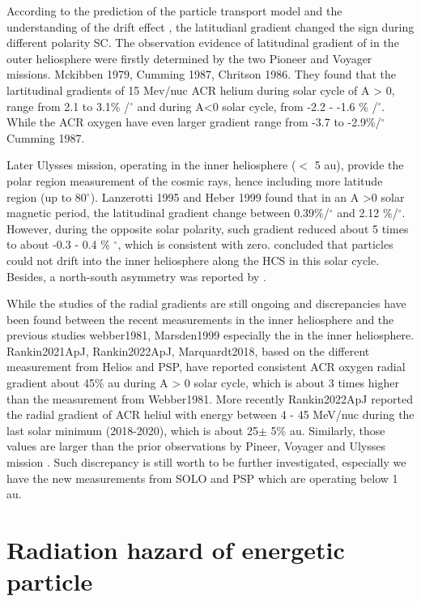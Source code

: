 According to the prediction of the particle transport model and the understanding of the drift effect , the latitudianl gradient changed the sign during different polarity \ac{SC}. The observation evidence of latitudinal gradient of in the outer heliosphere were firstly determined by the two Pioneer and Voyager missions. {Mckibben 1979, Cumming 1987, Chritson 1986}. They found that the lartitudinal gradients of 15 Mev/nuc \ac{ACR} helium during solar cycle of A > 0, range from 2.1 to 3.1\% /$^\circ$ and during A<0 solar cycle, from -2.2 - -1.6 \% /$^\circ$. While the ACR oxygen have even larger gradient range from -3.7 to -2.9\%/$^\circ$ {Cumming 1987}.

Later Ulysses mission, operating in the inner heliosphere ($<$ 5 au),  provide the polar region measurement of the cosmic rays, hence including more latitude region (up to 80$^\circ$). Lanzerotti 1995 and Heber 1999 found that in an A >0 solar magnetic period, the latitudinal gradient change between  0.39\%/$^\circ$ and 2.12 \%/$^\circ$. However, during the opposite solar polarity, such gradient reduced about 5 times to about -0.3 - 0.4 \% \/$^\circ$, which is consistent with zero. \citep{Cummings2009GeoRL} concluded that particles could not drift into the inner heliosphere along the \ac{HCS} in this solar cycle. Besides, a north-south asymmetry was reported by \citep{Simpson1996}.

While the studies of the radial gradients are still ongoing and discrepancies have been found between the recent measurements in the inner heliosphere \citep{Rankin2021ApJ, Marquardt2018} and the previous studies {webber1981,  Marsden1999} especially the in the inner heliosphere. {Rankin2021ApJ, Rankin2022ApJ, Marquardt2018}, based on the different measurement from Helios and \ac{PSP}, have reported consistent ACR oxygen radial gradient about 45\% \/au during A > 0 solar cycle, which is about 3 times higher than the measurement from Webber1981. More recently Rankin2022ApJ reported the radial gradient of ACR heliul with energy between 4 - 45 MeV/nuc during the last solar minimum (2018-2020), which is about 25$\pm$ 5\% \/au. Similarly, those values are larger than the prior observations by Pineer, Voyager and Ulysses mission \citep{McDonald 2001, Webber1981,  Bastian1981, Mckibben1989, McDonald1987, Cummings1987, Cummings1990}. Such discrepancy is still worth to be further investigated, especially we have the new measurements from \ac{SOLO} and \ac{PSP} which are operating below 1 au.


\section{Radiation hazard of energetic particle}


